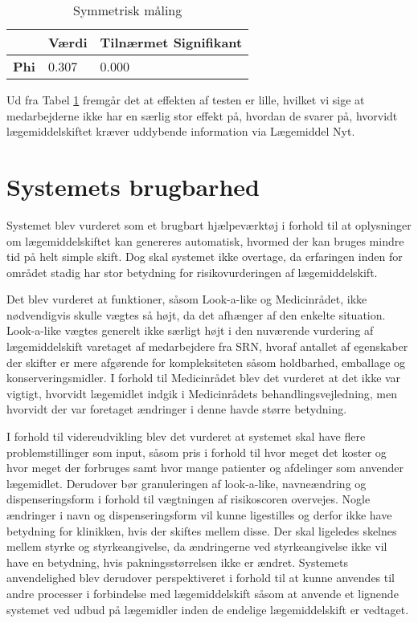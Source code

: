 \begin{table}[H]
\caption{Symmetrisk måling}
\vspace{2mm}
\label{table:test3}
\centering
\begin{tabular}{p{2cm}|p{2cm}|p{4.5cm}}
\cellcolor[HTML]{C0C0C0}\textbf{} & \cellcolor[HTML]{C0C0C0}\textbf{Værdi} & \cellcolor[HTML]{C0C0C0}\textbf{Tilnærmet Signifikant} \\ \hline
\cellcolor[HTML]{C0C0C0}\textbf{Phi} & 0.307 & 0.000 \\
\end{tabular}
\end{table}

Ud fra Tabel \ref{table:test3} fremgår det at effekten af testen er lille, hvilket vi sige at medarbejderne ikke har en særlig stor effekt på, hvordan de svarer på, hvorvidt lægemiddelskiftet kræver uddybende information via Lægemiddel Nyt.

\section{Systemets brugbarhed}
Systemet blev vurderet som et brugbart hjælpeværktøj i forhold til at oplysninger om lægemiddelskiftet kan genereres automatisk, hvormed der kan bruges mindre tid på helt simple skift. Dog skal systemet ikke overtage, da erfaringen inden for området stadig har stor betydning for risikovurderingen af lægemiddelskift. 

Det blev vurderet at funktioner, såsom Look-a-like og Medicinrådet, ikke nødvendigvis skulle vægtes så højt, da det afhænger af den enkelte situation. Look-a-like vægtes generelt ikke særligt højt i den nuværende vurdering af lægemiddelskift varetaget af medarbejdere fra SRN, hvoraf antallet af egenskaber der skifter er mere afgørende for kompleksiteten såsom holdbarhed, emballage og konserveringsmidler. I forhold til Medicinrådet blev det vurderet at det ikke var vigtigt, hvorvidt lægemidlet indgik i Medicinrådets behandlingsvejledning, men hvorvidt der var foretaget ændringer i denne havde større betydning. 

I forhold til videreudvikling blev det vurderet at systemet skal have flere problemstillinger som input, såsom pris i forhold til hvor meget det koster og hvor meget der forbruges samt hvor mange patienter og afdelinger som anvender lægemidlet. Derudover bør granuleringen af look-a-like, navneændring og dispenseringsform i forhold til vægtningen af risikoscoren overvejes. Nogle ændringer i navn og dispenseringsform vil kunne ligestilles og derfor ikke have betydning for klinikken, hvis der skiftes mellem disse. Der skal ligeledes skelnes mellem styrke og styrkeangivelse, da ændringerne ved styrkeangivelse ikke vil have en betydning, hvis pakningsstørrelsen ikke er ændret. Systemets anvendelighed blev derudover perspektiveret i forhold til at kunne anvendes til andre processer i forbindelse med lægemiddelskift såsom at anvende et lignende systemet ved udbud på lægemidler inden de endelige lægemiddelskift er vedtaget. 



